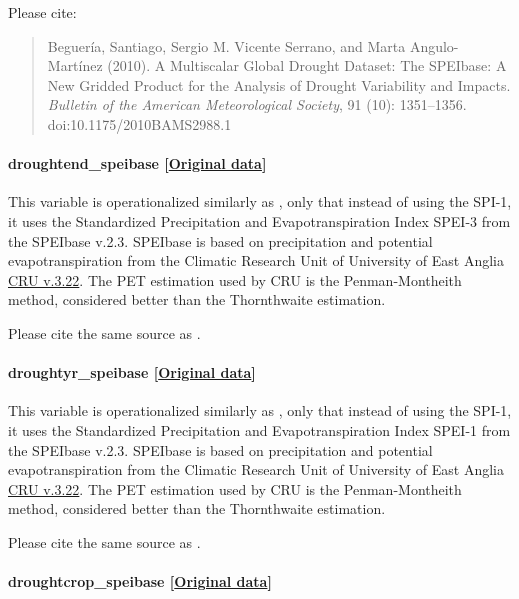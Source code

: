 \documentclass[]{book}
\begin{document}
Please cite:

\begin{quote}
Beguería, Santiago, Sergio M. Vicente Serrano, and Marta Angulo-Martínez
(2010). A Multiscalar Global Drought Dataset: The SPEIbase: A New
Gridded Product for the Analysis of Drought Variability and Impacts.
\emph{Bulletin of the American Meteorological Society}, 91 (10):
1351--1356. doi:10.1175/2010BAMS2988.1
\end{quote}

\paragraph{droughtend\_speibase
{[}\href{https://digital.csic.es/handle/10261/104742}{Original
data}{]}}\label{droughtend-speibase}

This variable is operationalized similarly as ,
only that instead of using the SPI-1, it uses the Standardized
Precipitation and Evapotranspiration Index SPEI-3 from the SPEIbase
v.2.3. SPEIbase is based on precipitation and potential
evapotranspiration from the Climatic Research Unit of University of East
Anglia \href{http://browse.ceda.ac.uk/browse/badc/cru/data}{CRU v.3.22}.
The PET estimation used by CRU is the Penman-Montheith method,
considered better than the Thornthwaite estimation.

Please cite the same source as .

\paragraph{droughtyr\_speibase
{[}\href{https://digital.csic.es/handle/10261/104742}{Original
data}{]}}\label{droughtyr-speibase}

This variable is operationalized similarly as ,
only that instead of using the SPI-1, it uses the Standardized
Precipitation and Evapotranspiration Index SPEI-1 from the SPEIbase
v.2.3. SPEIbase is based on precipitation and potential
evapotranspiration from the Climatic Research Unit of University of East
Anglia \href{http://browse.ceda.ac.uk/browse/badc/cru/data}{CRU v.3.22}.
The PET estimation used by CRU is the Penman-Montheith method,
considered better than the Thornthwaite estimation.

Please cite the same source as .

\paragraph{droughtcrop\_speibase
{[}\href{https://digital.csic.es/handle/10261/104742}{Original
data}{]}}\label{droughtcrop-speibase}
\end{document}

